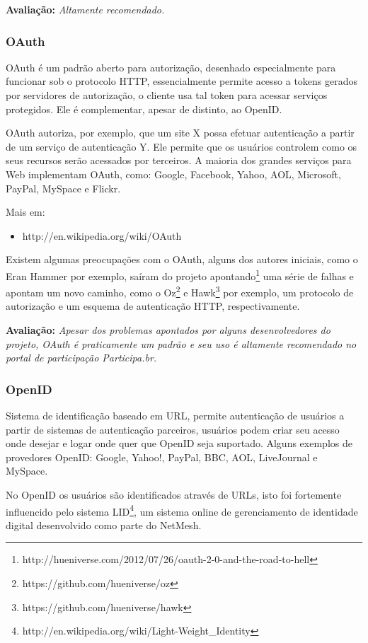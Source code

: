 \documentclass[11pt]{article}
\begin{document}
{\bf Avaliação:} {\it Altamente recomendado.}

\subsubsection{OAuth}

OAuth é um padrão aberto para autorização, desenhado especialmente para
funcionar sob o protocolo HTTP, essencialmente permite acesso a tokens gerados
por servidores de autorização, o cliente usa tal token para acessar serviços
protegidos. Ele é complementar, apesar de distinto, ao OpenID.

OAuth autoriza, por exemplo, que um site X possa efetuar autenticação a partir
de um serviço de autenticação Y. Ele permite que os usuários controlem como os seus
recursos serão acessados por terceiros. A maioria dos grandes serviços para
Web implementam OAuth, como: Google, Facebook, Yahoo, AOL, Microsoft, PayPal,
MySpace e Flickr.

Mais em:
\begin{itemize}
  \item{http://en.wikipedia.org/wiki/OAuth}
\end{itemize}

Existem algumas preocupações com o OAuth, alguns dos autores iniciais, como o
Eran Hammer por exemplo, saíram do projeto
apontando\footnote{http://hueniverse.com/2012/07/26/oauth-2-0-and-the-road-to-hell}
uma série de falhas e apontam um novo caminho, como o
Oz\footnote{https://github.com/hueniverse/oz} e
Hawk\footnote{https://github.com/hueniverse/hawk} por exemplo, um protocolo de
autorização e um esquema de autenticação HTTP, respectivamente.

{\bf Avaliação:} {\it Apesar dos problemas apontados por alguns
desenvolvedores do projeto, OAuth é praticamente um padrão e seu uso é
altamente recomendado no portal de participação Participa.br.}

\subsubsection{OpenID}

Sistema de identificação baseado em URL, permite autenticação de usuários a
partir de sistemas de autenticação parceiros, usuários podem criar seu acesso
onde desejar e logar onde quer que OpenID seja suportado. Alguns exemplos de
provedores OpenID: Google, Yahoo!, PayPal, BBC, AOL, LiveJournal e MySpace.

No OpenID os usuários são identificados através de URLs, isto foi fortemente
influencido pelo sistema
LID\footnote{http://en.wikipedia.org/wiki/Light-Weight\_Identity}, um sistema
online de gerenciamento de identidade digital desenvolvido como parte do
NetMesh.
\end{document}
